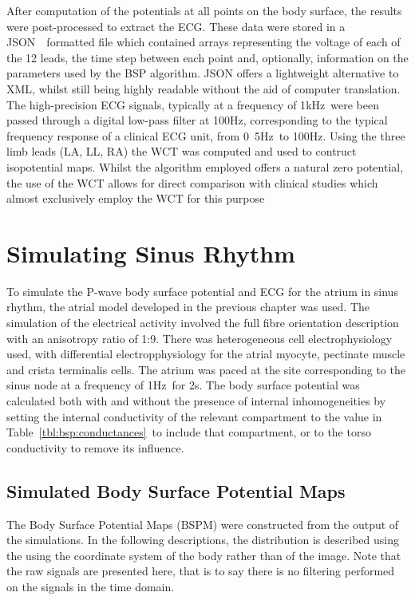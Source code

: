 After computation of the potentials at all points on the body surface, the
results were post-processed to extract the ECG.
These data were stored in a JSON~\cite{json}\ formatted file which contained
arrays representing the voltage of each of the 12 leads, the time step between
each point and, optionally, information on the parameters used by the BSP
algorithm.
JSON offers a lightweight alternative to XML, whilst still being highly readable
without the aid of computer translation.
The high-precision ECG signals, typically at a frequency of \unit{1}{kHz}\
were been passed through a digital low-pass filter at \unit{100}{Hz},
corresponding to the typical frequency response of a clinical ECG unit, from
\unit{0.5}{Hz}\ to \unit{100}{Hz}.
Using the three limb leads (LA, LL, RA) the WCT was computed and used to
contruct isopotential maps.
Whilst the algorithm employed offers a natural zero potential, the use of the
WCT allows for direct comparison with clinical studies which almost exclusively
employ the WCT for this purpose~\cite{Taccardi1966,Mirvis1980}


\section{Simulating Sinus Rhythm}

To simulate the P-wave body surface potential and ECG for the atrium in sinus
rhythm, the atrial model developed in the previous chapter was used.
The simulation of the electrical activity involved the full fibre orientation
description with an anisotropy ratio of 1:9.
There was heterogeneous cell electrophysiology used, with differential
electropphysiology for the atrial myocyte, pectinate muscle and crista
terminalis cells.
The atrium was paced at the site corresponding to the sinus node at a frequency
of \unit{1}{Hz}\ for \unit{2}{s}.
The body surface potential was calculated both with and without the presence of
internal inhomogeneities by setting the internal conductivity of the relevant
compartment to the value in Table~\ref{tbl:bsp:conductances}\ to include that
compartment, or to the torso conductivity to remove its influence.

\subsection{Simulated Body Surface Potential Maps}

The Body Surface Potential Maps (BSPM) were constructed from the output of the
simulations.
In the following descriptions, the distribution is described using the using the
coordinate system of the body rather than of the image.
Note that the raw signals are presented here, that is to say there is no
filtering performed on the signals in the time domain.


